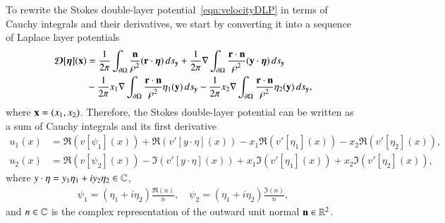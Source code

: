 \documentclass[preprint,10pt]{elsarticle}
\begin{document}
To rewrite the Stokes double-layer potential~\eqref{eqn:velocityDLP} in
terms of Cauchy integrals and their derivatives, we start by converting
it into a sequence of Laplace layer potentials~\cite{bar-wu-vee2015}
\begin{equation}
  \label{eqn:Stokes2Laplace}
  \begin{aligned}
    {\boldsymbol{\mathcal D}}[{\boldsymbol\eta}]({\mathbf{x}}) &= 
      \frac{1}{2\pi} \int_{{\partial}\Omega} 
        \frac{{\mathbf{n}}}{\rho^2} ({\mathbf{r}} \cdot {\boldsymbol\eta}) \, ds_{\mathbf{y}} + 
      \frac{1}{2\pi} \nabla \int_{{\partial}\Omega}
        \frac{{\mathbf{r}} \cdot {\mathbf{n}}}{\rho^2} ({\mathbf{y}} \cdot {\boldsymbol\eta}) \, ds_{\mathbf{y}} \\
      &- \frac{1}{2\pi} x_1 \nabla \int_{{\partial}\Omega}
        \frac{{\mathbf{r}} \cdot {\mathbf{n}}}{\rho^2}\eta_1({\mathbf{y}}) \, ds_{\mathbf{y}} -
      \frac{1}{2\pi} x_2 \nabla \int_{{\partial}\Omega}
        \frac{{\mathbf{r}} \cdot {\mathbf{n}}}{\rho^2}\eta_2({\mathbf{y}}) \, ds_{\mathbf{y}},
  \end{aligned}
\end{equation}
where ${\mathbf{x}} = (x_1,x_2)$. Therefore, the Stokes double-layer potential
can be written as a sum of Cauchy integrals and its first derivative 
\begin{equation}
  \begin{aligned}
    u_1(x) &= \Re (v[\psi_1](x)) + \Re (v'[y\cdot\eta](x)) 
             -x_1\Re (v'[\eta_1](x)) - x_2\Re (v'[\eta_2](x)), \\
    u_2(x) &= \Re (v[\psi_2](x)) - \Im (v'[y\cdot\eta](x)) 
         +x_1\Im (v'[\eta_1](x)) + x_2\Im (v'[\eta_2](x)),
  \end{aligned}
  \label{eqn:cauchyVelocity}
\end{equation}
where $y \cdot \eta = y_1 \eta_1 + i y_2 \eta_2 \in {\mathbb{C}}$, 
\begin{align} 
  \psi_1=(\eta_1+i\eta_2)\frac{\Re(n)}{n}, \quad
  \psi_2=(\eta_1+i\eta_2)\frac{\Im(n)}{n},
\end{align}
and $n \in {\mathbb{C}}$ is the complex representation of the outward unit normal
${\mathbf{n}} \in {\mathbb{R}}^2$.


\end{document}
